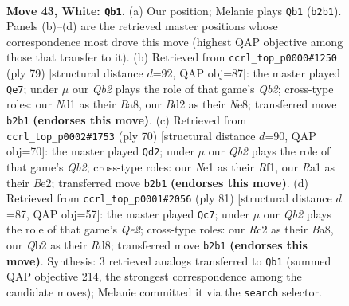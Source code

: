 \documentclass[11pt]{article}
\begin{document}
\clearpage

\begin{figure}[p]\centering
\begin{subfigure}{0.46\textwidth}\centering
\resizebox{\linewidth}{!}{%
\newchessgame
\chessboard[
  setfen={n1rbn1k1/1q6/p4r2/P1p2p1p/3p1Pp1/1P4P1/1QRBP2P/R2NN1K1 w - - 2 43},
  showmover=false,
  pgfstyle=straightmove, color=movearrow, markmove={b2-b1}
]}
\caption{}
\end{subfigure}\hfill
\begin{subfigure}{0.46\textwidth}\centering
\resizebox{\linewidth}{!}{%
\newchessgame
\chessboard[
  setfen={b1r1n1k1/1q3pp1/rp1pp2p/1N6/1PP1PP2/5B1P/1Q4P1/2RR3K b - - 26 40},
  showmover=false,
  pgfstyle=straightmove, color=movearrow, markmove={b7-e7}
]}
\caption{}
\end{subfigure}
\\[4pt]
\begin{subfigure}{0.46\textwidth}\centering
\resizebox{\linewidth}{!}{%
\newchessgame
\chessboard[
  setfen={3r1k2/1pr2bp1/pqnppp1p/8/P1P1PP2/1PNR3P/1Q2B1PK/5R2 w - - 1 36},
  showmover=false,
  pgfstyle=straightmove, color=movearrow, markmove={b2-d2}
]}
\caption{}
\end{subfigure}\hfill
\begin{subfigure}{0.46\textwidth}\centering
\resizebox{\linewidth}{!}{%
\newchessgame
\chessboard[
  setfen={b2r2k1/4q1p1/1p1pprn1/6b1/PpP4p/1P3P1P/2Q1N1PB/R2R1B1K b - - 3 41},
  showmover=false,
  pgfstyle=straightmove, color=movearrow, markmove={e7-c7}
]}
\caption{}
\end{subfigure}
\caption{\textbf{Move 43, White: \texttt{Qb1}.} (a) Our position; Melanie plays \texttt{Qb1} (\texttt{b2b1}). Panels (b)--(d) are the retrieved master positions whose correspondence most drove this move (highest QAP objective among those that transfer to it). (b) Retrieved from \texttt{ccrl\_top\_p0000\#1250} (ply 79) [structural distance $d$=92, QAP obj=87]: the master played \texttt{Qe7}; under $\mu$ our \emph{Qb2} plays the role of that game's \emph{Qb2}; cross-type roles: our \emph{N}d1 as their \emph{B}a8, our \emph{B}d2 as their \emph{N}e8; transferred move \texttt{b2b1} \textbf{(endorses this move)}. (c) Retrieved from \texttt{ccrl\_top\_p0002\#1753} (ply 70) [structural distance $d$=90, QAP obj=70]: the master played \texttt{Qd2}; under $\mu$ our \emph{Qb2} plays the role of that game's \emph{Qb2}; cross-type roles: our \emph{N}e1 as their \emph{R}f1, our \emph{R}a1 as their \emph{B}e2; transferred move \texttt{b2b1} \textbf{(endorses this move)}. (d) Retrieved from \texttt{ccrl\_top\_p0001\#2056} (ply 81) [structural distance $d$=87, QAP obj=57]: the master played \texttt{Qc7}; under $\mu$ our \emph{Qb2} plays the role of that game's \emph{Qe2}; cross-type roles: our \emph{R}c2 as their \emph{B}a8, our \emph{Q}b2 as their \emph{R}d8; transferred move \texttt{b2b1} \textbf{(endorses this move)}. Synthesis: 3 retrieved analogs transferred to \texttt{Qb1} (summed QAP objective 214, the strongest correspondence among the candidate moves); Melanie committed it via the \texttt{search} selector.}
\label{fig:thought-m84}
\end{figure}
\end{document}
